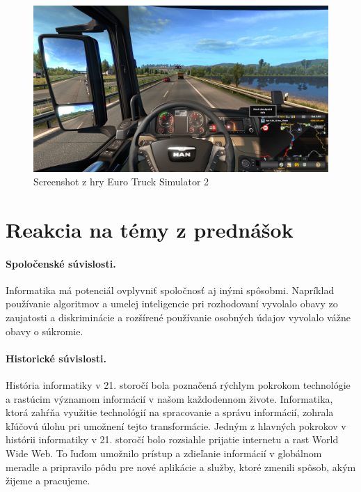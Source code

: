\documentclass[10pt,oneside,slovak,a4paper]{article}
\begin{document}
\begin{figure}[h]
\centering
\includegraphics[scale=0.15]{ets.jpg}
\caption{Screenshot z hry Euro Truck Simulator 2}
\label{f:ets2}
\end{figure}

\pagebreak

\section{Reakcia na témy z prednášok} \label{reakcia}

\paragraph{Spoločenské súvislosti.}

Informatika má potenciál ovplyvniť spoločnosť aj inými spôsobmi. Napríklad používanie algoritmov a umelej inteligencie pri rozhodovaní vyvolalo obavy zo zaujatosti a diskriminácie a rozšírené používanie osobných údajov vyvolalo vážne obavy o súkromie.

\paragraph{Historické súvislosti.}

História informatiky v 21. storočí bola poznačená rýchlym pokrokom technológie a rastúcim významom informácií v našom každodennom živote. Informatika, ktorá zahŕňa využitie technológií na spracovanie a správu informácií, zohrala kľúčovú úlohu pri umožnení tejto transformácie.
Jedným z hlavných pokrokov v histórii informatiky v 21. storočí bolo rozsiahle prijatie internetu a rast World Wide Web. To ľuďom umožnilo prístup a zdieľanie informácií v globálnom meradle a pripravilo pôdu pre nové aplikácie a služby, ktoré zmenili spôsob, akým žijeme a pracujeme.
\end{document}
